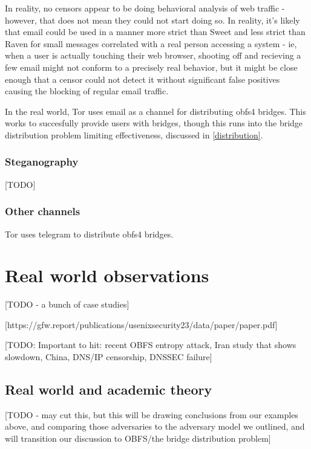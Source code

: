 \documentclass[12pt]{report}
\begin{document}
In reality, no censors appear to be doing behavioral analysis of web traffic - however, that does not mean they could not start doing so. In reality, it's likely that email could be used in a manner more strict than Sweet and less strict than Raven for small messages correlated with a real person accessing a system - ie, when a user is actually touching their web browser, shooting off and recieving a few email might not conform to a precisely real behavior, but it might be close enough that a censor could not detect it without significant false positives causing the blocking of regular email traffic.

In the real world, Tor uses email as a channel for distributing obfs4 bridges. This works to succesfully provide users with bridges, though this runs into the bridge distribution problem limiting effectiveness, discussed in \ref{distribution}.

\subsubsection{Steganography}

[TODO]

\subsubsection{Other channels}

Tor uses telegram to distribute obfs4 bridges.\cite{telegram}

\section{Real world observations}
\label{real}

[TODO - a bunch of case studies]

[https://gfw.report/publications/usenixsecurity23/data/paper/paper.pdf]

[TODO: Important to hit: recent OBFS entropy attack, Iran study that shows slowdown, China, DNS/IP censorship, DNSSEC failure]

\subsection{Real world and academic theory}

[TODO - may cut this, but this will be drawing conclusions from our examples above, and comparing those adversaries to the adversary model we outlined, and will transition our discussion to OBFS/the bridge distribution problem]
\end{document}

